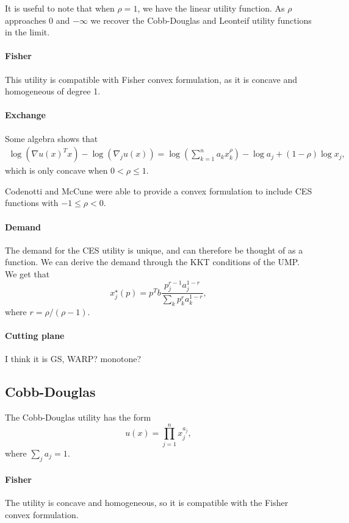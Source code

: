 \documentclass[12pt]{article}
\begin{document}
It is useful to note that when $\rho = 1$, we have the linear utility function. As $\rho$ approaches $0$ and $-\infty$ we recover the Cobb-Douglas and Leonteif
utility functions in the limit. %

\paragraph{Fisher}
This utility is compatible with Fisher convex formulation, as it is concave and homogeneous of degree 1.

\paragraph{Exchange}
Some algebra shows that 
\begin{align*}
\log(\nabla u(x)^T x) - \log(\nabla_j u(x)) =
\log\left(\sum_{k=1}^n a_k x_k^\rho \right) - \log a_j + (1-\rho) \log x_j,
\end{align*}
which is only concave when $0 < \rho \leq 1$.

Codenotti and McCune \cite{codenotti2005marketCES} were able to provide a convex formulation to include
CES functions with $-1 \leq \rho < 0$.

\paragraph{Demand}
The demand for the CES utility is unique, and can therefore be thought
of as a function.
We can derive the demand through the KKT conditions of the
UMP. We get that
\[
x^\star_j(p) = p^Tb\frac{p_j^{r-1} a_j^{1-r}}{\sum_k p_k^r a_k^{1-r}},
\]
where $r = \rho/(\rho-1)$.

\paragraph{Cutting plane} I think it is GS, WARP? monotone?

\subsection{Cobb-Douglas}
The Cobb-Douglas utility has the form
\[
u(x) = \prod_{j=1}^{n} x_j^{a_j},
\]
where $\sum_j a_j = 1$.

\paragraph{Fisher}
The utility is concave and homogeneous, so it is compatible with the Fisher
convex formulation.
\end{document}
